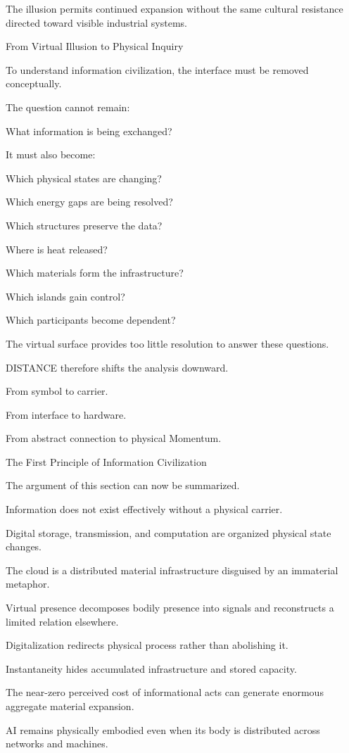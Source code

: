 The illusion permits continued expansion without the same cultural resistance directed toward visible industrial systems.

From Virtual Illusion to Physical Inquiry

To understand information civilization, the interface must be removed conceptually.

The question cannot remain:

What information is being exchanged?

It must also become:

Which physical states are changing?

Which energy gaps are being resolved?

Which structures preserve the data?

Where is heat released?

Which materials form the infrastructure?

Which islands gain control?

Which participants become dependent?

The virtual surface provides too little resolution to answer these questions.

DISTANCE therefore shifts the analysis downward.

From symbol to carrier.

From interface to hardware.

From abstract connection to physical Momentum.

The First Principle of Information Civilization

The argument of this section can now be summarized.

Information does not exist effectively without a physical carrier.

Digital storage, transmission, and computation are organized physical state changes.

The cloud is a distributed material infrastructure disguised by an immaterial metaphor.

Virtual presence decomposes bodily presence into signals and reconstructs a limited relation elsewhere.

Digitalization redirects physical process rather than abolishing it.

Instantaneity hides accumulated infrastructure and stored capacity.

The near-zero perceived cost of informational acts can generate enormous aggregate material expansion.

AI remains physically embodied even when its body is distributed across networks and machines.

